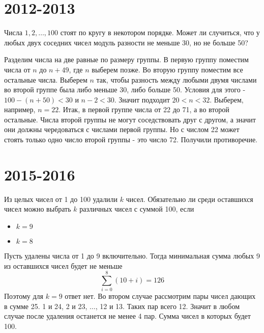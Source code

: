 \documentclass[11pt, a4paper]{template}
\begin{document}
\begin{solution}

\end{solution}

\chapter{2012-2013}

\begin{exercise}
Числа $1, 2, \dots, 100$ стоят по кругу в некотором порядке. Может ли случиться, что у любых двух соседних чисел модуль разности не меньше 30, но не больше 50?
\end{exercise}

\begin{solution}
Разделим числа на две равные по размеру группы. В первую группу поместим числа от $n$ до $n + 49$, где $n$ выберем позже. Во вторую группу поместим все остальные числа. Выберем $n$ так, чтобы разность между любыми двумя числами во второй группе была либо меньше 30, либо больше 50. Условия для этого - $100 - (n + 50) < 30$ и $n - 2 < 30$. Значит подходит $20 < n < 32$. Выберем, например, $n = 22$. Итак, в первой группе числа от 22 до 71, а во второй остальные. Числа второй группы не могут соседствовать друг с другом, а значит они должны чередоваться с числами первой группы. Но с числом 22 может стоять только одно число второй группы - это число 72. Получили противоречие.
\end{solution}

\chapter{2015-2016}

\begin{exercise}
Из целых чисел от 1 до 100 удалили $k$ чисел. Обязательно ли среди оставшихся чисел можно выбрать $k$ различных чисел с суммой 100, если
\begin{itemize}
\item $k = 9$
\item $k = 8$
\end{itemize}
\end{exercise}

\begin{solution}
Пусть удалены числа от 1 до 9 включительно. Тогда минимальная сумма любых 9 из оставшихся чисел будет не меньше 
$$
\sum_{i = 0}^{8} (10 + i) = 126
$$
Поэтому для $k = 9$ ответ нет. Во втором случае рассмотрим пары чисел дающих в сумме 25. 1 и 24, 2 и 23, $\dots$, 12 и 13. Таких пар всего 12. Значит в любом случае после удаления останется не менее 4 пар. Сумма чисел в которых будет 100.
\end{solution}
\end{document}
